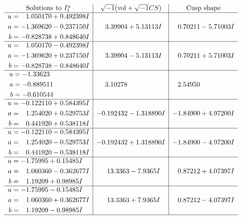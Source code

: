 \documentclass[1p]{elsarticle_modified}
\theoremstyle{definition}
\newcommand{\I}{\sqrt{-1}}
\begin{document}
$$\begin{array}{c|c|c}  
\text{Solutions to }I^u_{1}& \I (\text{vol} + \sqrt{-1}CS) & \text{Cusp shape}\\
 \hline 
\begin{aligned}
u &= \phantom{-}1.050170 + 0.492398 I \\
a &= -1.369620 - 0.237150 I \\
b &= -0.828738 + 0.848640 I\end{aligned}
 & \phantom{-}3.39904 + 5.13113 I & \phantom{-}0.70211 - 5.71003 I \\ \hline\begin{aligned}
u &= \phantom{-}1.050170 - 0.492398 I \\
a &= -1.369620 + 0.237150 I \\
b &= -0.828738 - 0.848640 I\end{aligned}
 & \phantom{-}3.39904 - 5.13113 I & \phantom{-}0.70211 + 5.71003 I \\ \hline\begin{aligned}
u &= -1.33623\phantom{ +0.000000I} \\
a &= -0.889511\phantom{ +0.000000I} \\
b &= -0.610544\phantom{ +0.000000I}\end{aligned}
 & \phantom{-}3.10278\phantom{ +0.000000I} & \phantom{-}2.54950\phantom{ +0.000000I} \\ \hline\begin{aligned}
u &= -0.122110 + 0.584395 I \\
a &= \phantom{-}1.254020 + 0.529753 I \\
b &= \phantom{-}0.441920 + 0.538118 I\end{aligned}
 & -0.192432 - 1.318890 I & -1.84900 + 4.97200 I \\ \hline\begin{aligned}
u &= -0.122110 - 0.584395 I \\
a &= \phantom{-}1.254020 - 0.529753 I \\
b &= \phantom{-}0.441920 - 0.538118 I\end{aligned}
 & -0.192432 + 1.318890 I & -1.84900 - 4.97200 I \\ \hline\begin{aligned}
u &= -1.75995 + 0.15485 I \\
a &= \phantom{-}1.060360 - 0.362677 I \\
b &= \phantom{-}1.19209 + 0.98985 I\end{aligned}
 & \phantom{-}13.3363 - 7.9365 I & \phantom{-}0.87212 + 4.07397 I \\ \hline\begin{aligned}
u &= -1.75995 - 0.15485 I \\
a &= \phantom{-}1.060360 + 0.362677 I \\
b &= \phantom{-}1.19209 - 0.98985 I\end{aligned}
 & \phantom{-}13.3363 + 7.9365 I & \phantom{-}0.87212 - 4.07397 I\\
 \hline 
 \end{array}$$\newpage\newpage\renewcommand{\arraystretch}{1}
\end{document}
